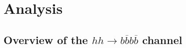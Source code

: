 
\chapter{Analysis}
\label{chapter:analysis}

\section{Overview of the $hh\rightarrow b\overline{b}b\overline{b}$ channel}

